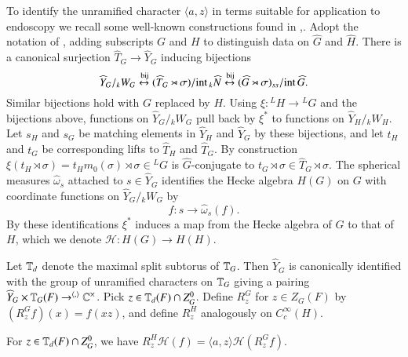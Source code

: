 \documentclass{amsart}
\newenvironment{cthm}[1]
  {\renewcommand\thethm{\bf #1}\thm}
  {\endthm}
\def\what#1{\widehat#1}
\def\bij{\buildrel{}\operatorname{bij}\over\leftrightarrow}
\def\BOREL{2}
\def\MACDONALD{23}
\begin{document}

To identify the unramified character $\langle a,z\rangle$ in terms suitable
for application to endoscopy we recall some well-known constructions
found in \cite{\BOREL},\cite{\MACDONALD}.   Adopt the notation
of \cite{\BOREL}, adding subscripts $G$ and $H$ to distinguish
data on $\what G$ and $\what H$.  There is a canonical surjection
$\what T_G\to \what Y_G$ inducing bijections
$$\what Y_G/{}_kW_G \bij (\what T_G\rtimes\sigma)/\text{int}\,{}_k\what N
	\bij (\what G\rtimes\sigma)_{ss}/\text{int}\,\what G.$$
Similar bijections hold with $G$ replaced by $H$.
Using $\xi:{}^LH\to{}^LG$ and the bijections above, functions on 
$\what Y_G/{}_kW_G$ pull back by $\xi^*$ to functions on $\what Y_H/{}_kW_H$.
Let $s_H$ and $s_G$ be matching elements in $\what Y_H$ and $\what Y_G$ by 
these bijections, and let $t_H$ and $t_G$ be corresponding lifts to 
$\what T_H$ and $\what T_G$.  By construction $\xi(t_H\rtimes\sigma) =
t_Hm_0(\sigma)\rtimes\sigma\in {}^LG$ is $\what G$-conjugate to $t_G\rtimes\sigma
\in \what T_G\rtimes \sigma$.  The spherical measures $\what \omega_s$ attached
to $s\in \what Y_G$ identifies the Hecke algebra $H(G)$ on $G$ with coordinate
functions on $\what Y_G/{}_kW_G$ by
$$f: s\to \what\omega_s(f).$$
By these identifications $\xi^*$ induces a map from the Hecke algebra of $G$
to that of $H$, which we denote $\mathcal{ H}:H(G)\to H(H)$.

Let $\Bbb T_d$ denote the maximal split subtorus of $\Bbb T_G$.
Then $\what Y_G$ is canonically identified with the group of
unramified characters on $\Bbb T_G$ giving a pairing
$\what Y_G \times \Bbb T_G(F) \to^{\langle,\rangle} \Bbb C^\times$.
Pick $z\in \Bbb T_d(F) \cap Z_G^0$.  
Define $R^G_z$ for $z\in Z_G(F)$ by $(R^G_zf)(x) = f(xz)$, and
define $R_z^H$ analogously on $C_c^\infty(H)$.

\begin{cthm}{Lemma 11.3}  For $z\in\Bbb T_d(F) \cap Z_G^0$,
we have $R_z^H\mathcal{ H}(f) = \langle a,z\rangle\mathcal{ H}(R_z^Gf)$.
\end{cthm}
\end{document}
